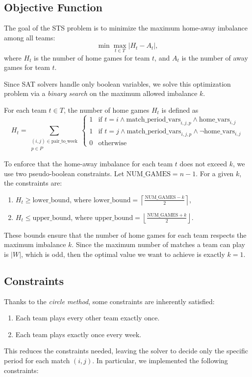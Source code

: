 \documentclass{article}
\begin{document}
\subsection{Objective Function}
The goal of the STS problem is to minimize the maximum home-away imbalance among all teams:
\[
\min \max_{t \in T} |H_t - A_t|,
\]
where $H_t$ is the number of home games for team $t$, and $A_t$ is the number of away games for team $t$.

Since SAT solvers handle only boolean variables, we solve this optimization problem via a \emph{binary search} on the maximum allowed imbalance $k$.

For each team $t \in T$, the number of home games $H_t$ is defined as
\[
H_t = \sum_{\substack{(i,j) \in \text{pair\_to\_week} \\ p \in P}}
\begin{cases}
1 & \text{if } t = i \land \text{match\_period\_vars}_{i,j,p} \land \text{home\_vars}_{i,j} \\
1 & \text{if } t = j \land \text{match\_period\_vars}_{i,j,p} \land \neg \text{home\_vars}_{i,j} \\
0 & \text{otherwise}
\end{cases}
\]

To enforce that the home-away imbalance for each team $t$ does not exceed $k$, we use two pseudo-boolean constraints. Let $\text{NUM\_GAMES} = n-1$. For a given $k$, the constraints are:
\begin{enumerate}
    \item $H_t \ge \text{lower\_bound}$, where $\text{lower\_bound} = \left\lceil \frac{\text{NUM\_GAMES} - k}{2} \right\rceil$,
    \item $H_t \le \text{upper\_bound}$, where $\text{upper\_bound} = \left\lfloor \frac{\text{NUM\_GAMES} + k}{2} \right\rfloor$.
\end{enumerate}
These bounds ensure that the number of home games for each team respects the maximum imbalance $k$. Since the maximum number of matches a team can play is $|W|$, which is odd, then the optimal value we want to achieve is exactly $k=1$.

\subsection{Constraints}
Thanks to the \emph{circle method}, some constraints are inherently satisfied:
\begin{enumerate}
    \item Each team plays every other team exactly once.
    \item Each team plays exactly once every week.
\end{enumerate}
This reduces the constraints needed, leaving the solver to decide only the specific period for each match $(i,j)$. In particular, we implemented the following constraints:
\end{document}
